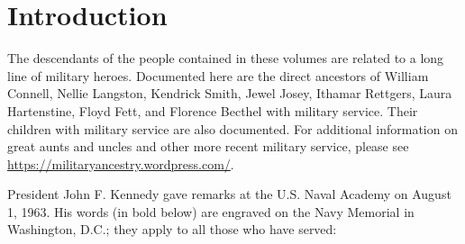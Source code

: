 \documentclass[11pt,letter]{book}
\begin{document}
\tableofcontents
\mainmatter
\chapter{Introduction}

The descendants of the people contained in these volumes are related to a long line of military heroes.  Documented here are the direct ancestors of William Connell, Nellie Langston, Kendrick Smith, Jewel Josey, Ithamar Rettgers, Laura Hartenstine, Floyd Fett, and Florence Becthel with military service.  Their children with military service are also documented.  For additional information on great aunts and uncles and other more recent military service, please see \url{https://militaryancestry.wordpress.com/}.

President John F. Kennedy gave remarks at the U.S. Naval Academy on August 1, 1963.  His words (in bold below) are engraved on the Navy Memorial in Washington, D.C.;  they apply to all those who have served:
\end{document}
